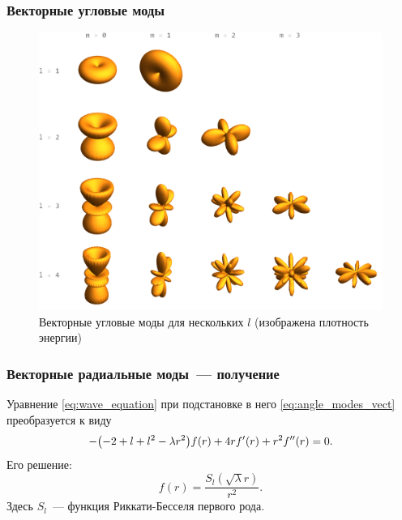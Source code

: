\documentclass[compress]{beamer}
\begin{document}
    \begin{frame}\frametitle{Векторные угловые моды}

        \begin{figure}[h]
            \centering
            \includegraphics[width=\textwidth,height=0.6\textheight,keepaspectratio]{angle_modes_vect_ii}
            \caption[]{Векторные угловые моды для нескольких $l$ (изображена плотность энергии)}
            \label{fig:angle_modes_vect_ii}
        \end{figure}

    \end{frame}


    \begin{frame}\frametitle{Векторные радиальные моды~--- получение}

        Уравнение \autoref{eq:wave_equation} при подстановке в него \autoref{eq:angle_modes_vect} преобразуется к виду
        \begin{equation*}
            - \qty(-2 + l + l^2 - \lambda r^2) f(r) +
            4 r f'(r) + r^2 f''(r) = 0 .
        \end{equation*}
        Его решение:
        \begin{equation*}
            f(r) = \frac{S_l(\sqrt\lambda r)}{r^2} .
        \end{equation*}
        Здесь $S_l$~--- функция Риккати-Бесселя первого рода.

    \end{frame}
\end{document}
